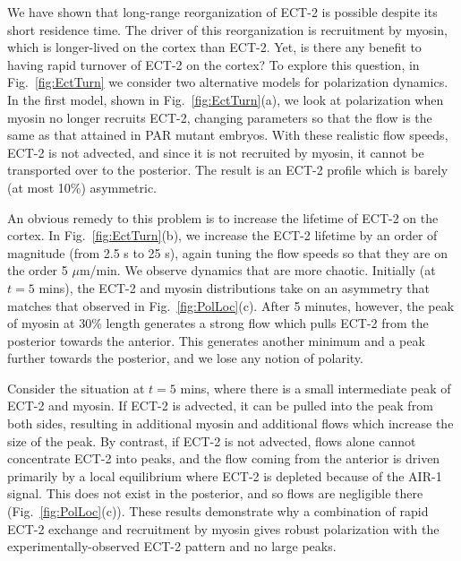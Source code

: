 \documentclass[11pt]{article}
\begin{document}
We have shown that long-range reorganization of ECT-2 is possible despite its short residence time. The driver of this reorganization is recruitment by myosin, which is longer-lived on the cortex than ECT-2. Yet, is there any benefit to having rapid turnover of ECT-2 on the cortex? To explore this question, in Fig.\ \ref{fig:EctTurn} we consider two alternative models for polarization dynamics. In the first model, shown in Fig.\ \ref{fig:EctTurn}(a), we look at polarization when myosin no longer recruits ECT-2, changing parameters so that the flow is the same as that attained in PAR mutant embryos. With these realistic flow speeds, ECT-2 is not advected, and since it is not recruited by myosin, it cannot be transported over to the posterior. The result is an ECT-2 profile which is barely (at most 10\%) asymmetric. 

An obvious remedy to this problem is to increase the lifetime of ECT-2 on the cortex. In Fig.\ \ref{fig:EctTurn}(b), we increase the ECT-2 lifetime by an order of magnitude (from 2.5 s to 25 s), again tuning the flow speeds so that they are on the order 5 $\mu$m/min. We observe dynamics that are more chaotic. Initially (at $t=5$ mins), the ECT-2 and myosin distributions take on an asymmetry that matches that observed in Fig.\ \ref{fig:PolLoc}(c). After 5 minutes, however, the peak of myosin at 30\% length generates a strong flow which pulls ECT-2 from the posterior towards the anterior. This generates another minimum and a peak further towards the posterior, and we lose any notion of polarity.

Consider the situation at $t=5$ mins, where there is a small intermediate peak of ECT-2 and myosin. If ECT-2 is advected, it can be pulled into the peak from both sides, resulting in additional myosin and additional flows which increase the size of the peak. By contrast, if ECT-2 is not advected, flows alone cannot concentrate ECT-2 into peaks, and the flow coming from the anterior is driven primarily by a local equilibrium where ECT-2 is depleted because of the AIR-1 signal. This does not exist in the posterior, and so flows are negligible there (Fig.\ \ref{fig:PolLoc}(c)). These results demonstrate why a combination of rapid ECT-2 exchange and recruitment by myosin gives robust polarization with the experimentally-observed ECT-2 pattern and no large peaks. 
\end{document}
